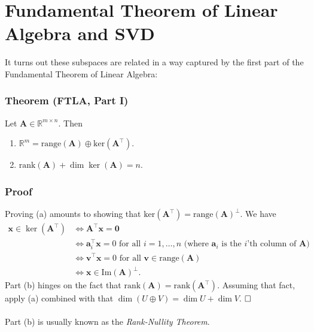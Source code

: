 \documentclass{article}
\begin{document}
\section{Fundamental Theorem of Linear Algebra and SVD}
It turns out these subspaces are related in a way captured by the first part of the Fundamental Theorem of Linear Algebra:
\subsubsection*{Theorem (FTLA, Part I)} Let $\mathbf{A} \in \mathbb{R}^{m \times n}$. Then 
\begin{enumerate}[label=(\alph*)]
    \item $\mathbb{R}^m = \text{range}(\mathbf{A}) \oplus \text{ker}(\mathbf{A}^\top)$.
    \item $\text{rank}(\mathbf{A}) + \dim \ker (\mathbf{A}) = n$. 
\end{enumerate} 
\subsubsection*{Proof}
Proving (a) amounts to showing that $\text{ker}(\mathbf{A}^{\top}) = \text{range}(\mathbf{A})^\perp$. We have
\begin{align*}
    \textbf{x} \in \ker(\mathbf{A}^{\top}) &\iff \mathbf{A^{\top} x} = \mathbf{0} \\
    &\iff \textbf{a}_i^{\top}\textbf{x} = 0 \text{ for all } i =1,\hdots,n \text{ (where $\textbf{a}_i$ is the $i$'th column of $\textbf{A}$)} \\
    &\iff \textbf{v}^\top\textbf{x} = 0 \text{ for all } \textbf{v} \in \text{range}(\mathbf{A}) \\
    &\iff \textbf{x} \in \text{Im}(\mathbf{A})^\perp.
\end{align*}
Part (b) hinges on the fact that $\text{rank}(\mathbf{A}) = \text{rank}(\mathbf{A}^\top)$. Assuming that fact, apply (a) combined with that $\dim (U \oplus V) = \dim U + \dim V$. $\hfill\square$
\\ \\
Part (b) is usually known as the \textit{Rank-Nullity Theorem}. 
\end{document}

